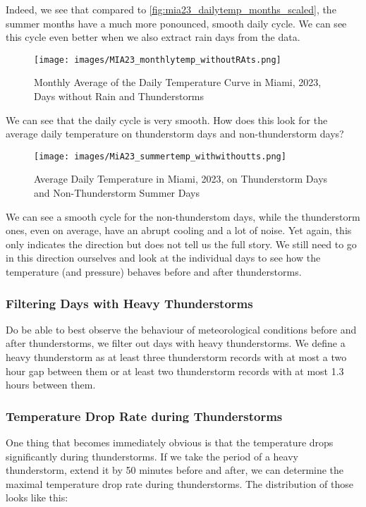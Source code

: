 \documentclass[12pt, parskip=half]{scrartcl}
\begin{document}
Indeed, we see that compared to \ref{fig:mia23_dailytemp_months_scaled}, the summer months have a much more ponounced, smooth daily cycle.
We can see this cycle even better when we also extract rain days from the data.

\begin{figure}[!h]
\centering
\texttt{[image: images/MIA23\_monthlytemp\_withoutRAts.png]}
\caption{Monthly Average of the Daily Temperature Curve in Miami, 2023, Days without Rain and Thunderstorms}
\end{figure}

We can see that the daily cycle is very smooth.
How does this look for the average daily temperature on thunderstorm days and non-thunderstorm days?

\begin{figure}[!h]
\centering
\texttt{[image: images/MiA23\_summertemp\_withwithoutts.png]}
\caption{Average Daily Temperature in Miami, 2023, on Thunderstorm Days and Non-Thunderstorm Summer Days}
\end{figure}

We can see a smooth cycle for the non-thunderstom days, while the thunderstorm ones, even on average, have an abrupt cooling and a lot of noise.
Yet again, this only indicates the direction but does not tell us the full story.
We still need to go in this direction ourselves and look at the individual days to see how the temperature (and pressure) behaves before and after thunderstorms.

\subsubsection{Filtering Days with Heavy Thunderstorms}
Do be able to best observe the behaviour of meteorological conditions before and after thunderstorms, we filter out days with heavy thunderstorms. 
We define a heavy thunderstorm as at least three thunderstorm records with at most a two hour gap between them or at least two thunderstorm records with at most 1.3 hours between them.

\subsubsection{Temperature Drop Rate during Thunderstorms}
One thing that becomes immediately obvious is that the temperature drops significantly during thunderstorms.
If we take the period of a heavy thunderstorm, extend it by 50 minutes before and after, we can determine the maximal temperature drop rate during thunderstorms.
The distribution of those looks like this:
\end{document}
